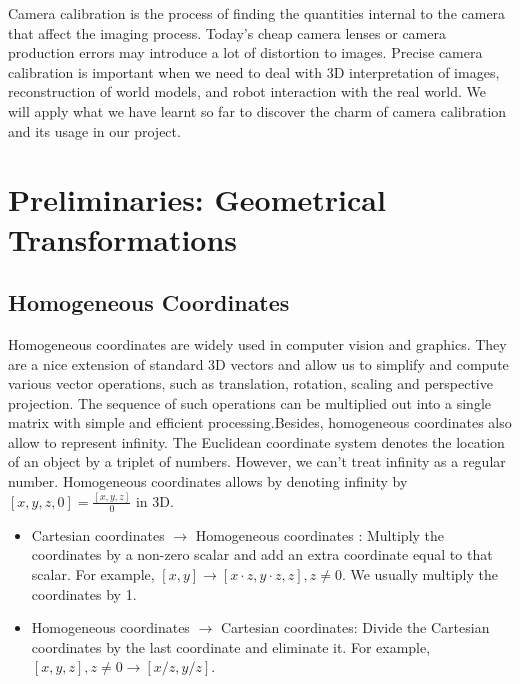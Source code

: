 

Camera calibration is the process of finding the quantities internal to the camera that affect the imaging process. Today's cheap camera lenses or camera production errors may introduce a lot of distortion to images. Precise camera calibration is important when we need to deal with 3D interpretation of images, reconstruction of world models, and robot interaction with the real world. We will apply what we have learnt so far to discover the charm of camera calibration and its usage in our project.
\section{Preliminaries: Geometrical Transformations}
\subsection{Homogeneous Coordinates}
Homogeneous coordinates are widely used in computer vision and graphics. They are a nice extension of standard 3D vectors and allow us to simplify and compute various vector operations, such as translation, rotation, scaling and perspective projection. The sequence of such operations can be multiplied out into a single matrix with simple and efficient processing.Besides, homogeneous coordinates also allow to represent infinity. The Euclidean coordinate system denotes the location of an object by a triplet of numbers. However, we can't treat infinity as a regular number. Homogeneous coordinates allows by denoting infinity by $[x, y, z, 0] = \frac{[x, y, z]}{0}$ in 3D. \\
\begin{tcolorbox}[sharp corners, colback=green!30, colframe=green!80!blue, title=\textbf{\large How to transfer between Cartesian Coordinates and Homogeneous Coordinates?}]
\begin{itemize}
    \item Cartesian coordinates $\rightarrow$ Homogeneous coordinates : Multiply the coordinates by a non-zero scalar and add an extra coordinate equal to that scalar. For example, $[x,y] \rightarrow [x\cdot z, y\cdot z, z], z\neq0$.  
  We usually multiply the coordinates by 1.
  \item  Homogeneous coordinates $\rightarrow$ Cartesian coordinates:
  Divide the Cartesian coordinates by the last coordinate and eliminate it. For example, $[x, y, z], z\neq 0 \rightarrow [x/z, y/z]$.
\end{itemize}
\end{tcolorbox}


